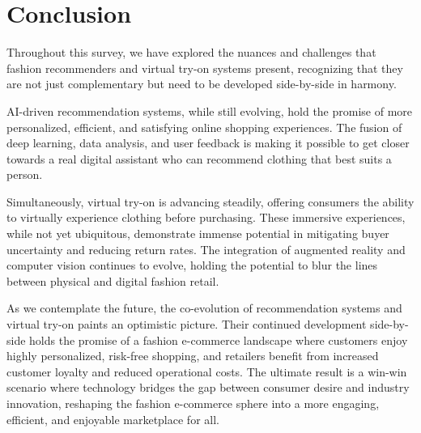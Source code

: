 \section{Conclusion} \label{section:conclusion}
	Throughout this survey, we have explored the nuances and challenges that fashion recommenders and virtual try-on systems present, recognizing that they are not just complementary but need to be developed side-by-side in harmony.

	AI-driven recommendation systems, while still evolving, hold the promise of more personalized, efficient, and satisfying online shopping experiences. The fusion of deep learning, data analysis, and user feedback is making it possible to get closer towards a real digital assistant who can recommend clothing that best suits a person.

	Simultaneously, virtual try-on is advancing steadily, offering consumers the ability to virtually experience clothing before purchasing. These immersive experiences, while not yet ubiquitous, demonstrate immense potential in mitigating buyer uncertainty and reducing return rates. The integration of augmented reality and computer vision continues to evolve, holding the potential to blur the lines between physical and digital fashion retail.

	As we contemplate the future, the co-evolution of recommendation systems and virtual try-on paints an optimistic picture. Their continued development side-by-side holds the promise of a fashion e-commerce landscape where customers enjoy highly personalized, risk-free shopping, and retailers benefit from increased customer loyalty and reduced operational costs. The ultimate result is a win-win scenario where technology bridges the gap between consumer desire and industry innovation, reshaping the fashion e-commerce sphere into a more engaging, efficient, and enjoyable marketplace for all.